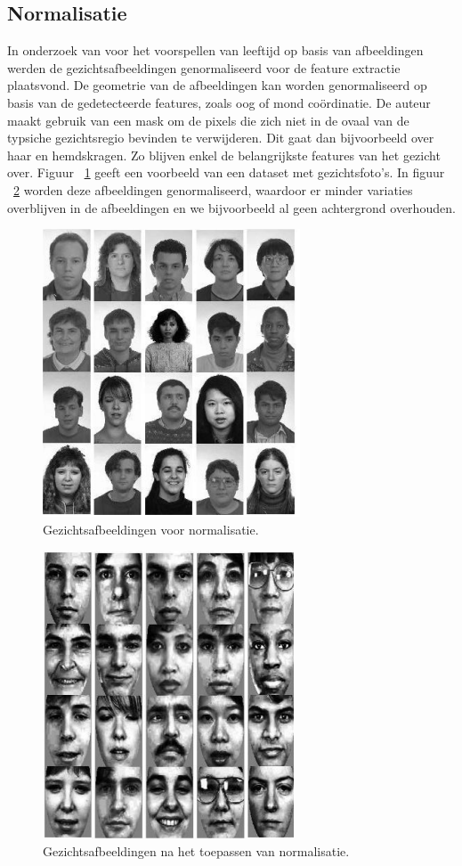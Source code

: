 \subsection{Normalisatie}\label{sub:normalisatie}
In onderzoek van \autocite{Chen2011} voor het voorspellen van leeftijd op basis van afbeeldingen werden de gezichtsafbeeldingen genormaliseerd voor de feature extractie plaatsvond. De geometrie van de afbeeldingen kan worden genormaliseerd op basis van de gedetecteerde features, zoals oog of mond coördinatie. De auteur maakt gebruik van een mask om de pixels die zich niet in de ovaal van de typsiche gezichtsregio bevinden te verwijderen. Dit gaat dan bijvoorbeeld over haar en hemdskragen. Zo blijven enkel de belangrijkste features van het gezicht over. Figuur {~\ref{fig:beforenormalisation}} geeft een voorbeeld van een dataset met gezichtsfoto's. In figuur {~\ref{fig:afternormalisation}} worden deze afbeeldingen genormaliseerd, waardoor er minder variaties overblijven in de afbeeldingen en we bijvoorbeeld al geen achtergrond overhouden.
\begin{figure}
    \centering
    \includegraphics{graphics/beforenorm.PNG}
    \caption[Gezichtsafbeeldingen voor normalisatie]{Gezichtsafbeeldingen voor normalisatie\autocite{Chen2011}.
        \label{fig:beforenormalisation}}
\end{figure}
\begin{figure}
    \centering
    \includegraphics{graphics/afternorm.PNG}
    \caption[Gezichtsafbeeldingen na normalisatie]{Gezichtsafbeeldingen na het toepassen van normalisatie\autocite{Chen2011}.
        \label{fig:afternormalisation}}
\end{figure}  \\
